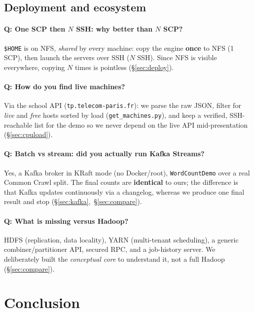 \documentclass[11pt,a4paper]{article}
\newcommand{\code}[1]{\texttt{\small #1}}
\begin{document}
\subsection{Deployment and ecosystem}

\paragraph{Q: One SCP then $N$ SSH: why better than $N$ SCP?}
\code{\$HOME} is on NFS, \emph{shared} by every machine: copy the engine
\textbf{once} to NFS (1 SCP), then launch the servers over SSH ($N$ SSH). Since
NFS is visible everywhere, copying $N$ times is pointless (\S\ref{sec:deploy}).

\paragraph{Q: How do you find live machines?}
Via the school API (\code{tp.telecom-paris.fr}): we parse the raw JSON, filter for
\emph{live} and \emph{free} hosts sorted by load (\code{get\_machines.py}), and
keep a verified, SSH-reachable list for the demo so we never depend on the live
API mid-presentation (\S\ref{sec:cpuload}).

\paragraph{Q: Batch vs stream: did you actually run Kafka Streams?}
Yes, a Kafka broker in KRaft mode (no Docker/root), \code{WordCountDemo} over a
real Common Crawl split. The final counts are \textbf{identical} to ours; the
difference is that Kafka updates continuously via a changelog, whereas we produce
one final result and stop (\S\ref{sec:kafka},~\S\ref{sec:compare}).

\paragraph{Q: What is missing versus Hadoop?}
HDFS (replication, data locality), YARN (multi-tenant scheduling), a generic
combiner/partitioner API, secured RPC, and a job-history server. We deliberately
built the \emph{conceptual core} to understand it, not a full Hadoop
(\S\ref{sec:compare}).

\section{Conclusion}\label{sec:conclusion}
\end{document}
